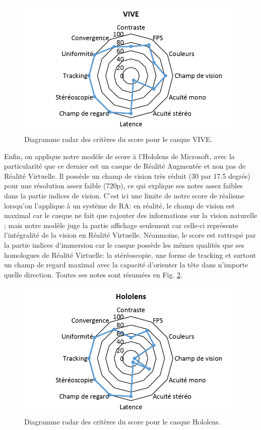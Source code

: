 \begin{figure}[h]
	\centering
	\includegraphics[scale=1]{Figures/RadarScoreVIVE}
	\caption{Diagramme radar des critères du score pour le casque VIVE.}
	\label{fig:radar_score_vive}
\end{figure}

\par Enfin, on applique notre modèle de score à l'Hololens de Microsoft, avec la particularité que ce dernier est un casque de Réalité Augmentée et non pas de Réalité Virtuelle. Il possède un champ de vision très réduit (30 par 17.5 degrés) pour une résolution assez faible (720p), ce qui explique ses notes assez faibles dans la partie indices de vision. C'est ici une limite de notre score de réalisme lorsqu'on l'applique à un système de RA: en réalité, le champ de vision est maximal car le casque ne fait que rajouter des informations sur la vision naturelle ; mais notre modèle juge la partie affichage seulement car celle-ci représente l'intégralité de la vision en Réalité Virtuelle. Néanmoins, le score est rattrapé par la partie indices d'immersion car le casque possède les mêmes qualités que ses homologues de Réalité Virtuelle: la stéréoscopie, une forme de tracking et surtout un champ de regard maximal avec la capacité d'orienter la tête dans n'importe quelle direction. Toutes ses notes sont résumées en Fig. \ref{fig:radar_score_hololens}.

\begin{figure}[h]
	\centering
	\includegraphics[scale=1]{Figures/RadarScoreHololens}
	\caption{Diagramme radar des critères du score pour le casque Hololens.}
	\label{fig:radar_score_hololens}
\end{figure}

